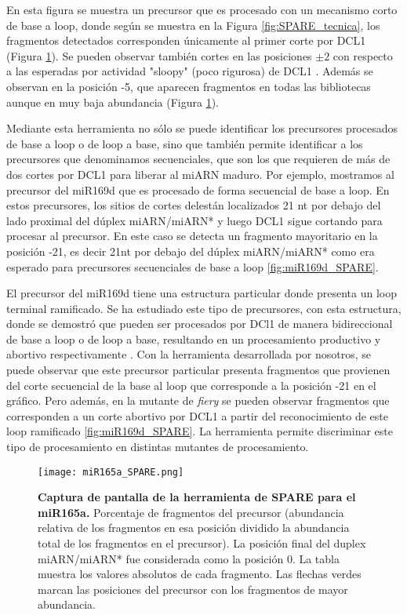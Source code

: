 En esta figura se muestra un precursor que es procesado con un mecanismo corto de base a loop, donde según se muestra en la Figura \ref{fig:SPARE_tecnica}, los fragmentos detectados corresponden únicamente al primer corte por DCL1 (Figura \ref{fig:miR165a_SPARE}).
Se pueden observar también cortes en las posiciones $\pm 2$ con respecto a las esperadas por actividad "sloopy" (poco rigurosa) de DCL1 \citep{pmid17989254}.
Además se observan en la posición -5, que aparecen fragmentos en todas las bibliotecas aunque en muy baja abundancia (Figura \ref{fig:miR165a_SPARE}).

Mediante esta herramienta no sólo se puede identificar los precursores procesados de base a loop o de loop a base, sino que también permite identificar a los precursores que denominamos secuenciales, que son los que requieren de más de dos cortes por DCL1 para liberar al miARN maduro.
Por ejemplo, mostramos al precursor del miR169d que es procesado de forma secuencial de base a loop.
En estos precursores, los sitios de cortes delestán localizados 21 nt por debajo del lado proximal del dúplex miARN/miARN* y luego DCL1 sigue cortando para procesar al precursor.
En este caso se detecta un fragmento mayoritario en la posición -21, es decir 21nt por debajo del dúplex miARN/miARN* como era esperado para precursores secuenciales de base a loop \ref{fig:miR169d_SPARE}.

El precursor del miR169d tiene una estructura particular donde presenta un loop terminal ramificado.
Se ha estudiado este tipo de precursores, con esta estructura, donde se demostró que pueden ser procesados por DCl1 de manera bidireccional de base a loop o de loop a base, resultando en un procesamiento productivo y abortivo respectivamente \citep{pmid23934148}.
Con la herramienta desarrollada por nosotros, se puede observar que este precursor particular presenta fragmentos que provienen del corte secuencial de la base al loop que corresponde a la posición -21 en el gráfico.
Pero además, en la mutante de \textit{fiery} se pueden observar fragmentos que corresponden a un corte abortivo por DCL1 a partir del reconocimiento de este loop ramificado \ref{fig:miR169d_SPARE}.
La herramienta permite discriminar este tipo de procesamiento en distintas mutantes de procesamiento. 

\begin{landscape}
    \begin{figure}[htbp!] 
        \centering    
        \texttt{[image: miR165a\_SPARE.png]}
        \caption[Captura de pantalla de la herramienta de SPARE para el miR165a]{
        \textbf{Captura de pantalla de la herramienta de SPARE para el miR165a.}
        Porcentaje de fragmentos del precursor (abundancia relativa de los fragmentos en esa posición dividido la abundancia total de los fragmentos en el precursor).
        La posición final del duplex miARN/miARN* fue considerada como la posición 0.
        La tabla muestra los valores absolutos de cada fragmento.
        Las flechas verdes marcan las posiciones del precursor con los fragmentos de mayor abundancia. 
        }
         \label{fig:miR165a_SPARE}
    \end{figure}
\end{landscape}

